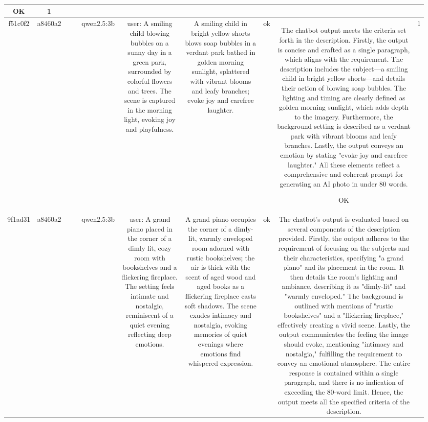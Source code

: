 \begin{table}[h!]
\begin{tabular}{|c|c|c|c|c|c|c|c|c|c|}
OK & 1\\
\hline
f51c0f2 & a8460a2 &  &  & qwen2.5:3b & user: A smiling child blowing bubbles on a sunny day in a green park, surrounded by colorful flowers and trees. The scene is captured in the morning light, evoking joy and playfulness. & A smiling child in bright yellow shorts blows soap bubbles in a verdant park bathed in golden morning sunlight, splattered with vibrant blooms and leafy branches; evoke joy and carefree laughter. & ok & The chatbot output meets the criteria set forth in the description. Firstly, the output is concise and crafted as a single paragraph, which aligns with the requirement. The description includes the subject—a smiling child in bright yellow shorts—and details their action of blowing soap bubbles. The lighting and timing are clearly defined as golden morning sunlight, which adds depth to the imagery. Furthermore, the background setting is described as a verdant park with vibrant blooms and leafy branches. Lastly, the output conveys an emotion by stating "evoke joy and carefree laughter." All these elements reflect a comprehensive and coherent prompt for generating an AI photo in under 80 words.

OK & 1\\
\hline
9f1ad31 & a8460a2 &  &  & qwen2.5:3b & user: A grand piano placed in the corner of a dimly lit, cozy room with bookshelves and a flickering fireplace. The setting feels intimate and nostalgic, reminiscent of a quiet evening reflecting deep emotions. & A grand piano occupies the corner of a dimly-lit, warmly enveloped room adorned with rustic bookshelves; the air is thick with the scent of aged wood and aged books as a flickering fireplace casts soft shadows. The scene exudes intimacy and nostalgia, evoking memories of quiet evenings where emotions find whispered expression. & ok & The chatbot's output is evaluated based on several components of the description provided. Firstly, the output adheres to the requirement of focusing on the subjects and their characteristics, specifying "a grand piano" and its placement in the room. It then details the room's lighting and ambiance, describing it as "dimly-lit" and "warmly enveloped." The background is outlined with mentions of "rustic bookshelves" and a "flickering fireplace," effectively creating a vivid scene. Lastly, the output communicates the feeling the image should evoke, mentioning "intimacy and nostalgia," fulfilling the requirement to convey an emotional atmosphere. The entire response is contained within a single paragraph, and there is no indication of exceeding the 80-word limit. Hence, the output meets all the specified criteria of the description.


\end{tabular}
\end{table}
